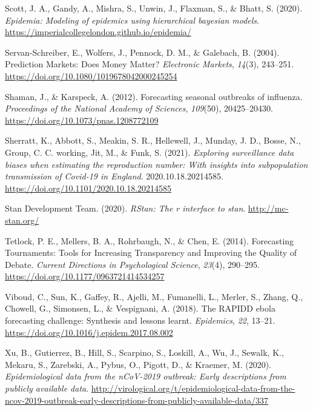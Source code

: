 \documentclass[
]{article}
\newlength{\cslhangindent}
\newlength{\cslentryspacingunit} %
\newenvironment{CSLReferences}[2] %
 {%
  \setlength{\parindent}{0pt}
  \ifodd #1
  \let\oldpar\par
  \def\par{\hangindent=\cslhangindent\oldpar}
  \fi
  \setlength{\parskip}{#2\cslentryspacingunit}
 }%
 {}
\begin{document}
\begin{CSLReferences}{1}{0}
\leavevmode{}%
Scott, J. A., Gandy, A., Mishra, S., Unwin, J., Flaxman, S., \& Bhatt, S. (2020). \emph{Epidemia: Modeling of epidemics using hierarchical bayesian models}. \url{https://imperialcollegelondon.github.io/epidemia/}

\leavevmode{}%
Servan-Schreiber, E., Wolfers, J., Pennock, D. M., \& Galebach, B. (2004). Prediction {Markets}: Does {Money Matter}? \emph{Electronic Markets}, \emph{14}(3), 243--251. \url{https://doi.org/10.1080/1019678042000245254}

\leavevmode{}%
Shaman, J., \& Karspeck, A. (2012). Forecasting seasonal outbreaks of influenza. \emph{Proceedings of the National Academy of Sciences}, \emph{109}(50), 20425--20430. \url{https://doi.org/10.1073/pnas.1208772109}

\leavevmode{}%
Sherratt, K., Abbott, S., Meakin, S. R., Hellewell, J., Munday, J. D., Bosse, N., Group, C. C. working, Jit, M., \& Funk, S. (2021). \emph{Exploring surveillance data biases when estimating the reproduction number: With insights into subpopulation transmission of {Covid}-19 in {England}}. 2020.10.18.20214585. \url{https://doi.org/10.1101/2020.10.18.20214585}

\leavevmode{}%
Stan Development Team. (2020). \emph{RStan: The r interface to stan}. \url{http://mc-stan.org/}

\leavevmode{}%
Tetlock, P. E., Mellers, B. A., Rohrbaugh, N., \& Chen, E. (2014). Forecasting {Tournaments}: Tools for {Increasing Transparency} and {Improving} the {Quality} of {Debate}. \emph{Current Directions in Psychological Science}, \emph{23}(4), 290--295. \url{https://doi.org/10.1177/0963721414534257}

\leavevmode{}%
Viboud, C., Sun, K., Gaffey, R., Ajelli, M., Fumanelli, L., Merler, S., Zhang, Q., Chowell, G., Simonsen, L., \& Vespignani, A. (2018). The {RAPIDD} ebola forecasting challenge: Synthesis and lessons learnt. \emph{Epidemics}, \emph{22}, 13--21. \url{https://doi.org/10.1016/j.epidem.2017.08.002}

\leavevmode{}%
Xu, B., Gutierrez, B., Hill, S., Scarpino, S., Loskill, A., Wu, J., Sewalk, K., Mekaru, S., Zarebski, A., Pybus, O., Pigott, D., \& Kraemer, M. (2020). \emph{Epidemiological data from the nCoV-2019 outbreak: Early descriptions from publicly available data}. \url{http://virological.org/t/epidemiological-data-from-the-ncov-2019-outbreak-early-descriptions-from-publicly-available-data/337}


\end{CSLReferences}
\end{document}
